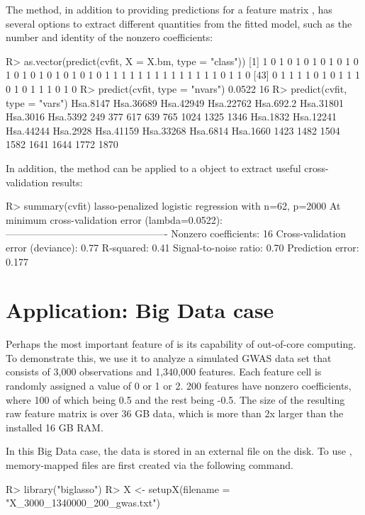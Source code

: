 The  method, in addition to providing predictions for a feature matrix , has several options to extract different quantities from the fitted model, such as the number and identity of the nonzero coefficients:
\begin{example}
R> as.vector(predict(cvfit, X = X.bm, type = "class"))
 [1] 1 0 1 0 1 0 1 0 1 0 1 0 1 0 1 0 1 0 1 0 1 0 1 0 1 1 1 1 1 1 1 1 1 1 1 1 1 1 0 1 1 0
[43] 0 1 1 1 1 0 1 0 1 1 1 0 1 0 1 1 1 0 1 0
R> predict(cvfit, type = "nvars")
0.0522 
    16 
R> predict(cvfit, type = "vars")
 Hsa.8147 Hsa.36689 Hsa.42949 Hsa.22762 Hsa.692.2 Hsa.31801  Hsa.3016  Hsa.5392 
      249       377       617       639       765      1024      1325      1346 
 Hsa.1832 Hsa.12241 Hsa.44244  Hsa.2928 Hsa.41159 Hsa.33268  Hsa.6814  Hsa.1660 
     1423      1482      1504      1582      1641      1644      1772      1870 
\end{example}

In addition, the  method can be applied to a  object to extract useful cross-validation results:
\begin{example}
R> summary(cvfit)
lasso-penalized logistic regression with n=62, p=2000
At minimum cross-validation error (lambda=0.0522):
-------------------------------------------------
  Nonzero coefficients: 16
  Cross-validation error (deviance): 0.77
  R-squared: 0.41
  Signal-to-noise ratio: 0.70
  Prediction error: 0.177
\end{example}

\section{Application: Big Data case}

Perhaps the most important feature of  is its capability of out-of-core computing. To demonstrate this, we use it to analyze a simulated GWAS data set that consists of 3,000 observations and 1,340,000 features. Each feature cell is randomly assigned a value of 0 or 1 or 2. 200 features have nonzero coefficients, where 100 of which being 0.5 and the rest being -0.5. The size of the resulting raw feature matrix is over 36 GB data, which is more than 2x larger than the installed 16 GB RAM.

In this Big Data case, the data is stored in an external file on the disk. To use , memory-mapped files are first created via the following command.

\begin{example}
R> library("biglasso")
R> X <- setupX(filename = "X_3000_1340000_200_gwas.txt")
\end{example}

